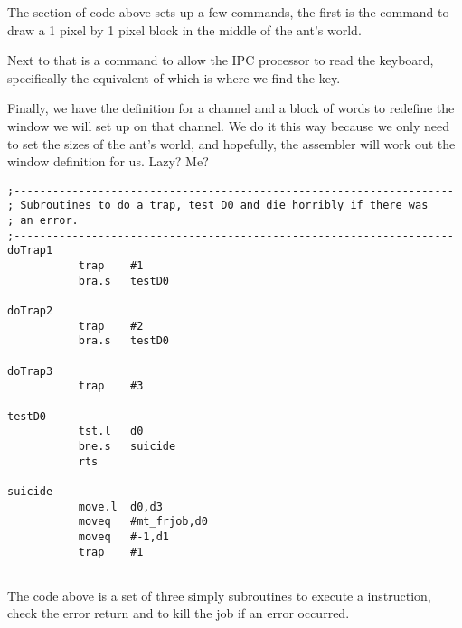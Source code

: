 The section of code above sets up a few commands, the first is the  command to draw a 1 pixel by 1 pixel block in the middle of the ant's world.

Next to that is a command to allow the IPC processor to read the keyboard, specifically the equivalent of  which is where we find the  key.

Finally, we have the definition for a  channel and a block of words to redefine the window we will set up on that channel. We do it this way because we only need to set the sizes of the ant's world, and hopefully, the assembler will work out the window definition for us. Lazy? Me?

\begin{lstlisting}[firstnumber=last,caption={Langtons Ant - Trap Subroutines}]
;--------------------------------------------------------------------
; Subroutines to do a trap, test D0 and die horribly if there was
; an error.
;--------------------------------------------------------------------
doTrap1
           trap    #1
           bra.s   testD0

doTrap2
           trap    #2
           bra.s   testD0

doTrap3
           trap    #3

testD0
           tst.l   d0
           bne.s   suicide
           rts

suicide
           move.l  d0,d3
           moveq   #mt_frjob,d0
           moveq   #-1,d1
           trap    #1


\end{lstlisting}

The code above is a set of three simply subroutines to execute a  instruction, check the error return and to kill the job if an error occurred.

